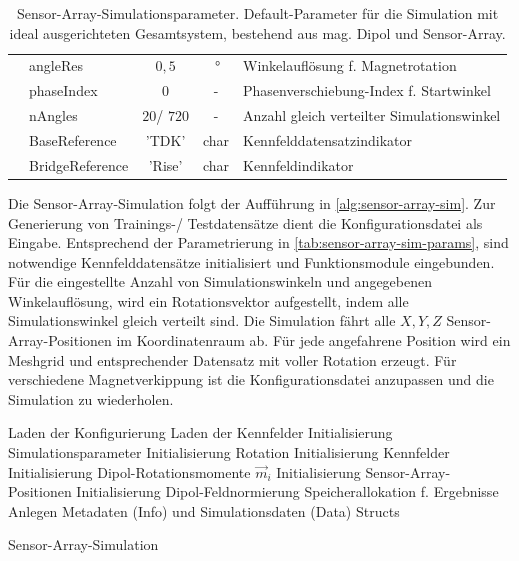 \begin{table}[!htbp]
{\begin{tabular}{l l c c l}
												 & angleRes 		  & $0,5$ 			   & $\SI{}{\degree}$ 				 & Winkelauflösung f. Magnetrotation \\
												 & phaseIndex 		  & 0 				   & - 								 & Phasenverschiebung-Index f. Startwinkel\\
												 & nAngles 			  & $20$/ $720$ 	   & -  							 & Anzahl gleich verteilter Simulationswinkel \\
												 & BaseReference 	  & 'TDK' 			   & char 							 & Kennfelddatensatzindikator \\
												 & BridgeReference 	  & 'Rise' 			   & char 							 & Kennfeldindikator \\
		\bottomrule		
	\end{tabular}}
	\caption[Sensor-Array-Simulationsparameter]{Sensor-Array-Simulationsparameter. Default-Parameter für die Simulation mit ideal ausgerichteten Gesamtsystem, bestehend aus mag. Dipol und Sensor-Array.}
	\label{tab:sensor-array-sim-params}
\end{table}


\clearpage


Die Sensor-Array-Simulation folgt der Aufführung in \autoref{alg:sensor-array-sim}. Zur Generierung von Trainings-/ Testdatensätze dient die Konfigurationsdatei als Eingabe. Entsprechend der Parametrierung in \autoref{tab:sensor-array-sim-params}, sind notwendige Kennfelddatensätze initialisiert und Funktionsmodule eingebunden. Für die eingestellte Anzahl von Simulationswinkeln und angegebenen Winkelauflösung, wird ein Rotationsvektor aufgestellt, indem alle Simulationswinkel gleich verteilt sind. Die Simulation fährt alle $X,Y,Z$ Sensor-Array-Positionen im Koordinatenraum ab. Für jede angefahrene Position wird ein Meshgrid und entsprechender Datensatz mit voller Rotation erzeugt. Für verschiedene Magnetverkippung ist die Konfigurationsdatei anzupassen und die Simulation zu wiederholen.


\begin{algorithm}
	\SetAlgoLined
	Laden der Konfigurierung\;
	Laden der Kennfelder\;
	Initialisierung Simulationsparameter\;
	Initialisierung Rotation\;
	Initialisierung Kennfelder\;
	Initialisierung Dipol-Rotationsmomente $\vec{m}_i$\;
	Initialisierung Sensor-Array-Positionen\;
	Initialisierung Dipol-Feldnormierung\;
	Speicherallokation f. Ergebnisse\;
	Anlegen Metadaten (Info) und Simulationsdaten (Data) Structs\;
	\caption{Sensor-Array-Simulation}
	\label{alg:sensor-array-sim}
\end{algorithm}


